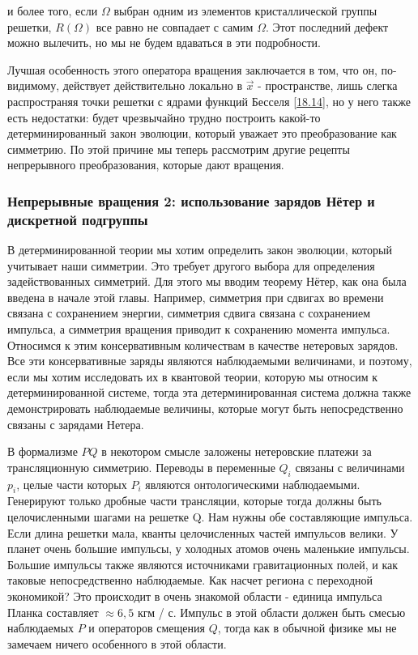 \documentclass[main.tex]{subfiles}
\begin{document}
и более того, если $\Omega$ выбран одним из элементов кристаллической группы решетки, $R (\Omega)$ все равно не совпадает с самим $\Omega$. Этот последний дефект можно вылечить, но мы не будем вдаваться в эти подробности.

Лучшая особенность этого оператора вращения заключается в том, что он, по-видимому, действует действительно локально в $\vec{x}$ - пространстве, лишь слегка распространяя точки решетки с ядрами функций Бесселя \ref{18.14}, но у него также есть недостатки: будет чрезвычайно трудно построить какой-то детерминированный закон эволюции, который уважает это преобразование как симметрию. По этой причине мы теперь рассмотрим другие рецепты непрерывного преобразования, которые дают вращения.


\subsubsection{Непрерывные вращения 2: использование зарядов Нётер и дискретной подгруппы}\label{ch18.2.3}

В детерминированной теории мы хотим определить закон эволюции, который учитывает наши симметрии. Это требует другого выбора для определения задействованных симметрий. Для этого мы вводим теорему Нётер, как она была введена в начале этой главы. Например, симметрия при сдвигах во времени связана с сохранением энергии, симметрия сдвига связана с сохранением импульса, а симметрия вращения приводит к сохранению момента импульса. Относимся к этим консервативным количествам в качестве нетеровых зарядов. Все эти консервативные заряды являются наблюдаемыми величинами, и поэтому, если мы хотим исследовать их в квантовой теории, которую мы относим к детерминированной системе, тогда эта детерминированная система должна также демонстрировать наблюдаемые величины, которые могут быть непосредственно связаны с зарядами Нетера.

В формализме $PQ$ в некотором смысле заложены нетеровские платежи за трансляционную симметрию. Переводы в переменные $Q_i$ связаны с величинами $p_i$, целые части которых $P_i$ являются онтологическими наблюдаемыми. Генерируют только дробные части
трансляции, которые тогда должны быть целочисленными шагами на решетке Q. Нам нужны обе составляющие импульса. Если длина решетки мала, кванты целочисленных частей импульсов велики. У планет очень большие импульсы, у холодных атомов очень маленькие импульсы. Большие импульсы также являются источниками гравитационных полей, и как таковые непосредственно наблюдаемые. Как насчет региона с переходной экономикой? Это происходит в очень знакомой области - единица импульса Планка составляет $\approx 6,5$ кгм / с. Импульс в этой области должен быть смесью наблюдаемых $P$ и операторов смещения $Q$, тогда как в обычной физике мы не замечаем ничего особенного в этой области.
\end{document}
